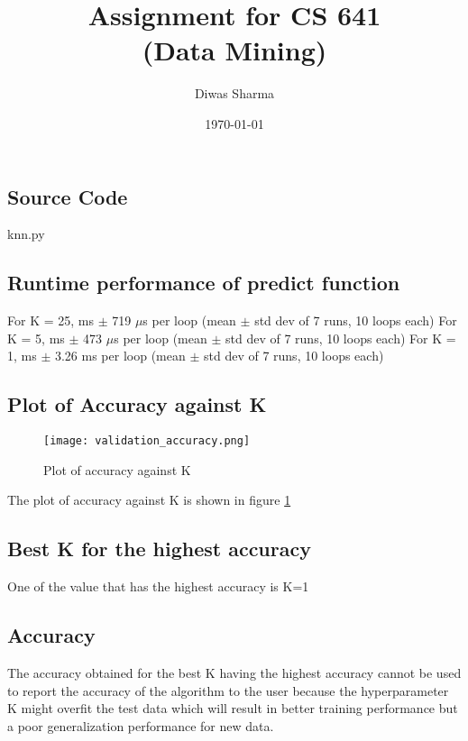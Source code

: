 \documentclass{article}
\title{Assignment for CS 641 \\ (Data Mining)}
\author{Diwas Sharma}
\date{\today}
\begin{document}
\maketitle
\newpage

\section{}
\subsection{Source Code}
\begin{lstinputlisting}[language=python]{knn.py}
\end{lstinputlisting}

\subsection{Runtime performance of predict function}

For K = 25,  ms $\pm$ 719 $\mu$s per loop (mean $\pm$ std dev of 7 runs, 10 loops each)\newline
For K = 5,  ms $\pm$ 473 $\mu$s per loop (mean $\pm$ std dev of 7 runs, 10 loops each)\newline
For K = 1,  ms $\pm$ 3.26 ms per loop (mean $\pm$ std dev of 7 runs, 10 loops each)


\subsection{Plot of Accuracy against K}
\begin{figure}[!ht]
  \texttt{[image: validation\_accuracy.png]}
  \caption{Plot of accuracy against K}
  \label{fig:accuracy_plot}
\end{figure}
The plot of accuracy against K is shown in figure \ref{fig:accuracy_plot}

\subsection{Best K for the highest accuracy}
One of the value that has the highest accuracy is K=1

\subsection{Accuracy}
The accuracy obtained for the best K having the highest accuracy cannot be
used to report the accuracy of the algorithm to the user because the hyperparameter
K might overfit the test data which will result in better training performance
but a poor generalization performance for new data.
\end{document}

